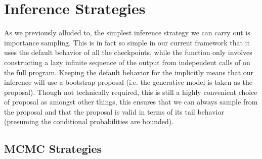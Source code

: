 
\section{Inference Strategies}
\label{sec:proginf:str}


As we previously alluded to, the simplest inference strategy we can carry out is importance
sampling.  This is in fact so simple in our current framework that it uses the default behavior
of all the checkpoints, while the \anginfer function only involves constructing a lazy infinite
sequence of the output from independent calls of  on the full program.
Keeping the default behavior for the \sample implicitly means that our
inference will use a bootstrap proposal (i.e. the generative model is taken as the proposal).
Though not technically required, this is still a highly convenient choice of proposal as
amongst other things, this ensures that we can always sample from the proposal and
that the proposal is valid in terms of its tail behavior (presuming the conditional probabilities
are bounded).

\subsection{MCMC Strategies}
\label{sec:proginf:str:lmh}

